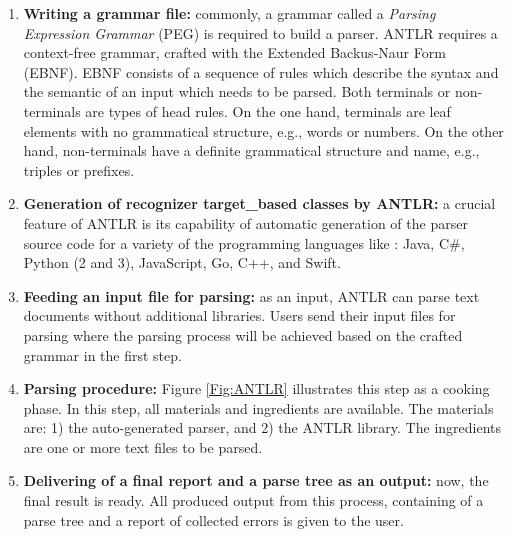 \begin{enumerate}
		\item  {\bf Writing a grammar file:} commonly, a grammar called a \emph{Parsing Expression Grammar} (PEG) is required to build a parser. 
		ANTLR requires a context-free grammar, crafted with the Extended Backus-Naur Form (EBNF). 
		EBNF consists of a sequence of rules which describe the syntax and the semantic of an input which needs to be parsed. 
		Both terminals or non-terminals are types of head rules. 
		On the one hand, terminals are leaf elements with no grammatical structure, e.g., words or numbers. On the other hand, non-terminals have a definite grammatical structure and name, e.g., triples or prefixes. 

		\item {\bf Generation of recognizer target\_based classes by ANTLR:} a crucial feature of ANTLR is its capability of automatic generation of the parser source code for a variety of the programming languages like \cite{ANTLR:Website:Online}: Java, C\#, Python (2 and 3), JavaScript, Go, C++, and Swift.
		
		\item {\bf Feeding an input file for parsing:} as an input, ANTLR can parse text documents without additional libraries. 
		Users send their input files for parsing where the parsing process will be achieved based on the crafted grammar in the first step.
		
		\item {\bf Parsing procedure:} {Figure \ref{Fig:ANTLR} } illustrates this step as a cooking phase. 
		In this step, all materials and ingredients are available. 
		The materials are: 1) the auto-generated parser, and 2) the ANTLR library. 
		The ingredients are one or more text files to be parsed. 
		
		\item {\bf Delivering of a final report and a parse tree as an output:} now, the final result is ready.
		All produced output from this process, containing of a parse tree and a report of collected errors is given to the user.
	\end{enumerate}











